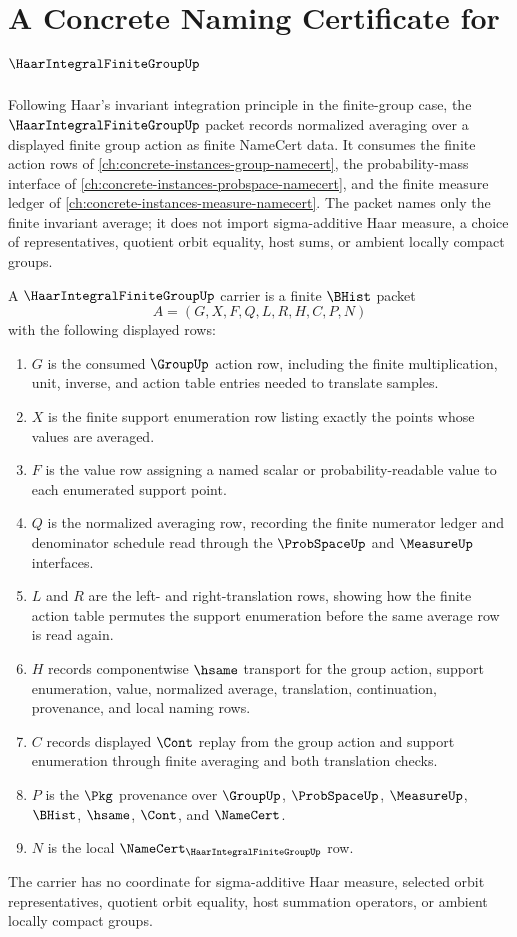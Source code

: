 \chapter{A Concrete Naming Certificate for $\HaarIntegralFiniteGroupUp$}
\label{ch:concrete-instances-haar-integral-finite-group-namecert}

Following Haar's invariant integration principle in the finite-group case, the $\HaarIntegralFiniteGroupUp$ packet records normalized averaging over a displayed finite group action as finite NameCert data. It consumes the finite action rows of \autoref{ch:concrete-instances-group-namecert}, the probability-mass interface of \autoref{ch:concrete-instances-probspace-namecert}, and the finite measure ledger of \autoref{ch:concrete-instances-measure-namecert}. The packet names only the finite invariant average; it does not import sigma-additive Haar measure, a choice of representatives, quotient orbit equality, host sums, or ambient locally compact groups.

\begin{definition}
\label{def:haar-integral-finite-group-averaging-carrier}
A $\HaarIntegralFiniteGroupUp$ carrier is a finite $\BHist$ packet
$$
A=(G,X,F,Q,L,R,H,C,P,N)
$$
with the following displayed rows:
\begin{enumerate}
\item $G$ is the consumed $\GroupUp$ action row, including the finite multiplication, unit, inverse, and action table entries needed to translate samples.
\item $X$ is the finite support enumeration row listing exactly the points whose values are averaged.
\item $F$ is the value row assigning a named scalar or probability-readable value to each enumerated support point.
\item $Q$ is the normalized averaging row, recording the finite numerator ledger and denominator schedule read through the $\ProbSpaceUp$ and $\MeasureUp$ interfaces.
\item $L$ and $R$ are the left- and right-translation rows, showing how the finite action table permutes the support enumeration before the same average row is read again.
\item $H$ records componentwise $\hsame$ transport for the group action, support enumeration, value, normalized average, translation, continuation, provenance, and local naming rows.
\item $C$ records displayed $\Cont$ replay from the group action and support enumeration through finite averaging and both translation checks.
\item $P$ is the $\Pkg$ provenance over $\GroupUp$, $\ProbSpaceUp$, $\MeasureUp$, $\BHist$, $\hsame$, $\Cont$, and $\NameCert$.
\item $N$ is the local $\NameCert_{\HaarIntegralFiniteGroupUp}$ row.
\end{enumerate}
The carrier has no coordinate for sigma-additive Haar measure, selected orbit representatives, quotient orbit equality, host summation operators, or ambient locally compact groups.
\end{definition}

